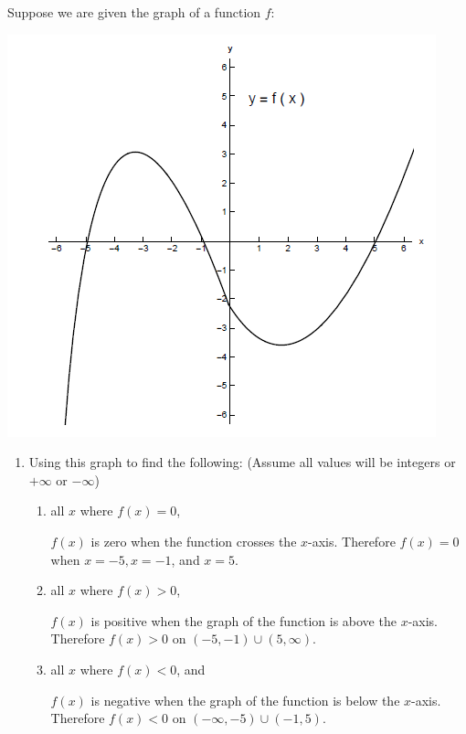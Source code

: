 \documentclass[nooutcomes,handout]{ximera}
\begin{document}
\begin{problem}
  Suppose we are given the graph of a function $f$:
  \begin{image}
    \includegraphics[scale=.7]{Figure1.png}
  \end{image}
  \begin{enumerate}
    \item
      Using this graph to find the following:  (Assume all values will be integers or $+\infty$ or $-\infty$)
      \begin{enumerate}
        \item 
          all $x$ where $f(x) = 0$,
          \begin{freeResponse}
            $f(x)$ is zero when the function crosses the $x$-axis.
            Therefore $f(x) = 0$ when $x = -5, x=-1$, and $x = 5$.
          \end{freeResponse}

        \item 
          all $x$ where $f(x) > 0$, 
          \begin{freeResponse}
            $f(x)$ is positive when the graph of the function is above the $x$-axis.
            Therefore $f(x) > 0$ on $(-5,-1) \cup (5,\infty)$. 
          \end{freeResponse}

        \item
          all $x$ where $f(x) < 0$, and
          \begin{freeResponse}
            $f(x)$ is negative when the graph of the function is below the $x$-axis.
            Therefore $f(x) < 0$ on $(-\infty ,-5) \cup (-1,5)$.
          \end{freeResponse}


\end{enumerate}
\end{enumerate}
\end{problem}
\end{document}
